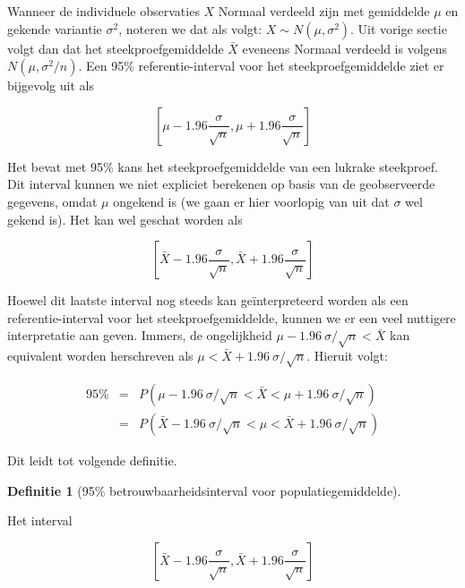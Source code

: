 \documentclass[
  12pt,dutch,coursenotes]{book}
\theoremstyle{definition}
\newtheorem{definition}{Definitie}[chapter]
\theoremstyle{definition}
\theoremstyle{definition}
\theoremstyle{definition}
\theoremstyle{remark}
\begin{document}
Wanneer de individuele observaties \(X\) Normaal verdeeld zijn met gemiddelde \(\mu\) en gekende variantie \(\sigma^2\), noteren we dat als volgt: \(X\sim N(\mu,\sigma^2)\).
Uit vorige sectie volgt dan dat het steekproefgemiddelde \(\bar{X}\) eveneens Normaal verdeeld is volgens \(N(\mu,\sigma^2/n)\). Een 95\% referentie-interval voor het steekproefgemiddelde ziet er bijgevolg uit als

\begin{equation*}
\left[\mu - 1.96 \frac{\sigma}{\sqrt{n}},\mu + 1.96 \frac{\sigma}{\sqrt{n}}%
\right]
\end{equation*}

Het bevat met 95\% kans het steekproefgemiddelde van een lukrake
steekproef. Dit interval kunnen we niet expliciet berekenen op basis van de
geobserveerde gegevens, omdat \(\mu\) ongekend is (we gaan er hier voorlopig
van uit dat \(\sigma\) wel gekend is). Het kan wel geschat worden als

\begin{equation*}
\left[\bar X - 1.96 \frac{\sigma}{\sqrt{n}},\bar X + 1.96 \frac{\sigma}{\sqrt{n}}\right]
\end{equation*}

Hoewel dit laatste interval nog steeds kan geïnterpreteerd worden als
een referentie-interval voor het steekproefgemiddelde, kunnen we er een veel
nuttigere interpretatie aan geven. Immers, de ongelijkheid \(\mu - 1.96 \
\sigma/\sqrt{n} < \bar{X}\) kan equivalent worden herschreven als \(\mu < \bar{X} + 1.96 \ \sigma/\sqrt{n}\). Hieruit volgt:

\begin{eqnarray*}
95\% &=& P( \mu - 1.96 \ \sigma/\sqrt{n} < \bar{X} < \mu + 1.96 \ \sigma/\sqrt{n} ) \\
&=&P( \bar{X} - 1.96 \ \sigma/\sqrt{n} < \mu < \bar{X} + 1.96 \ \sigma/\sqrt{n} )
\end{eqnarray*}

Dit leidt tot volgende definitie.

\begin{definition}[95\% betrouwbaarheidsinterval voor populatiegemiddelde]
\protect\hypertarget{def:unnamed-chunk-144}{}{\label{def:unnamed-chunk-144} {} }
\end{definition}
Het interval

\begin{equation}
\left[\bar X - 1.96 \frac{\sigma}{\sqrt{n}},\bar X + 1.96 \frac{\sigma}{\sqrt{n}}\right] \label{eq:bi}
\end{equation}
\end{document}
